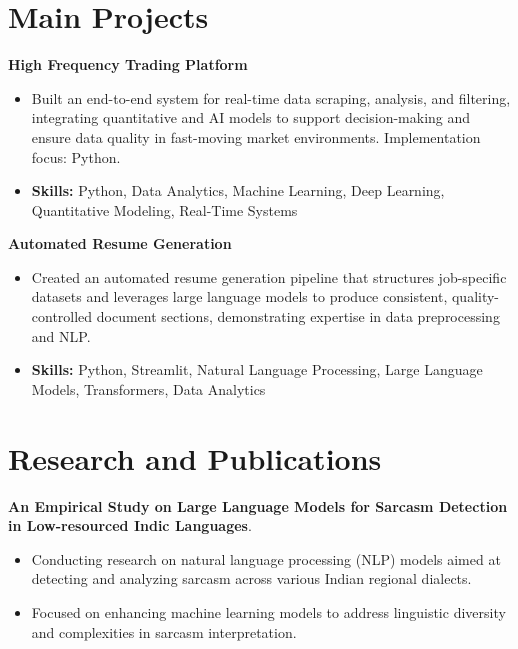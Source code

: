 \documentclass[a4paper,11pt]{article}
\begin{document}
\section{\textbf{Main Projects}}

\vspace{1mm}
  \textbf{High Frequency Trading Platform  }
\vspace{-1.5mm} %
\begin{itemize}
  \item Built an end-to-end system for real-time data scraping, analysis, and filtering, integrating quantitative and AI models to support decision-making and ensure data quality in fast-moving market environments. Implementation focus: Python.
\vspace{-3mm}
  \item \textbf{Skills:} Python, Data Analytics, Machine Learning, Deep Learning, Quantitative Modeling, Real-Time Systems
\end{itemize}


\vspace{1mm}
   \textbf{Automated Resume Generation }
\vspace{-1.5mm} %
\begin{itemize}
  \item Created an automated resume generation pipeline that structures job-specific datasets and leverages large language models to produce consistent, quality-controlled document sections, demonstrating expertise in data preprocessing and NLP.
\vspace{-3mm}
  \item \textbf{Skills:} Python, Streamlit, Natural Language Processing, Large Language Models, Transformers, Data Analytics
\end{itemize}



\section{\textbf{Research and Publications} \hfill }
\vspace{1mm}
  \textbf{An Empirical Study on Large Language Models for Sarcasm Detection in Low-resourced Indic Languages}.
\vspace{-1mm} %
\begin{itemize}
  \item Conducting research on natural language processing (NLP) models aimed at detecting and analyzing sarcasm across various Indian regional dialects.
\vspace{-3mm}
  \item Focused on enhancing machine learning models to address linguistic diversity and complexities in sarcasm interpretation.
\end{itemize}
\end{document}
